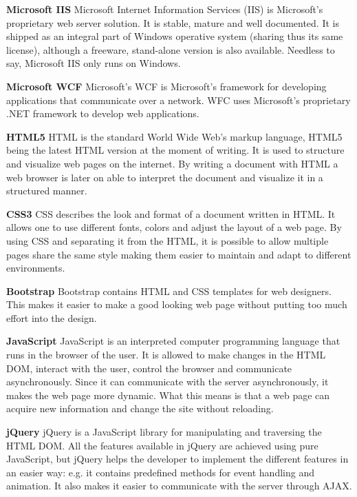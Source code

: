 \textbf{Microsoft IIS}\cite{}\newline
Microsoft Internet Information Services (IIS) is Microsoft's proprietary web server solution.
It is stable, mature and well documented. It is shipped as an integral part of Windows operative system (sharing thus
its same license), although a freeware, stand-alone version is also available. Needless to say, Microsoft IIS only
runs on Windows.

\textbf{Microsoft WCF}\cite{}\newline
Microsoft's WCF is Microsoft's framework for developing applications that communicate over a network.
WFC uses Microsoft's proprietary .NET framework to develop web applications.

\textbf{HTML5}\cite{HTML5}\newline
HTML is the standard World Wide Web's markup language, HTML5 being the latest HTML version at the moment of writing.
It is used to structure and visualize web pages on the internet. By writing a document with HTML a
web browser is later on able to interpret the document and visualize it in a structured manner. 

\textbf{CSS3}\cite{CSS3}\newline
CSS describes the look and format of a document written in HTML.
It allows one to use different fonts, colors and adjust the layout of a web page.
By using CSS and separating it from the HTML, it is possible to allow multiple pages share the same style
making them easier to maintain and adapt to different environments. 

\textbf{Bootstrap}\cite{Bootstrap}\newline
Bootstrap contains HTML and CSS templates for web designers.
This makes it easier to make a good looking web page without putting too much effort into the design.

\textbf{JavaScript}\cite{JavaScript}\newline
JavaScript is an interpreted computer programming language that runs in the browser of the user.
It is allowed to make changes in the HTML DOM, interact with the user, control the browser and communicate asynchronously.
Since it can communicate with the server asynchronously, it makes the web page more dynamic.
What this means is that a web page can acquire new information and change the site without reloading.

\textbf{jQuery}\cite{jQuery}\newline
jQuery is a JavaScript library for manipulating and traversing the HTML DOM.
All the features available in jQuery are achieved using pure JavaScript, but jQuery helps
the developer to implement the different features in an easier way:
e.g. it contains predefined methods for event handling and animation.
It also makes it easier to communicate with the server through AJAX. 

